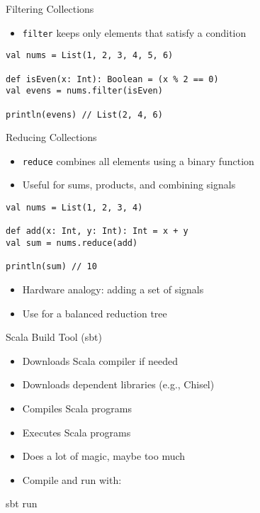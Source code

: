 \begin{frame}[fragile]{Filtering Collections}
\begin{itemize}
    \item \texttt{filter} keeps only elements that satisfy a condition
\end{itemize}

\begin{verbatim}
val nums = List(1, 2, 3, 4, 5, 6)

def isEven(x: Int): Boolean = (x % 2 == 0)
val evens = nums.filter(isEven)

println(evens) // List(2, 4, 6)
\end{verbatim}

\end{frame}

\begin{frame}[fragile]{Reducing Collections}
\begin{itemize}
    \item \texttt{reduce} combines all elements using a binary function
    \item Useful for sums, products, and combining signals
\end{itemize}

\begin{verbatim}
val nums = List(1, 2, 3, 4)

def add(x: Int, y: Int): Int = x + y
val sum = nums.reduce(add)

println(sum) // 10
\end{verbatim}

\begin{itemize}
    \item Hardware analogy: adding a set of signals
    \item Use  for a balanced reduction tree
\end{itemize}
\end{frame}



\begin{frame}[fragile]{Scala Build Tool (sbt)}
\begin{itemize}
\item Downloads Scala compiler if needed
\item Downloads dependent libraries (e.g., Chisel)
\item Compiles Scala programs
\item Executes Scala programs
\item Does a lot of magic, maybe too much
\item Compile and run with:
\end{itemize}
\begin{chisel}
sbt run
\end{chisel}
\end{frame}


